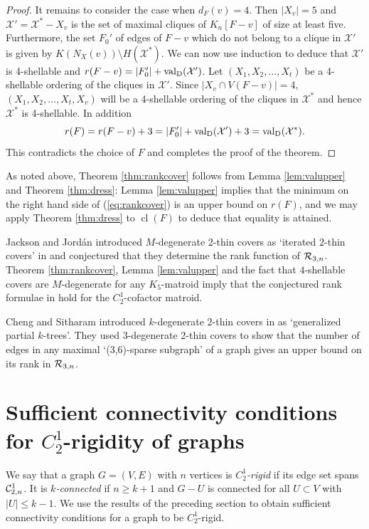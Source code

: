 \documentclass{daj}
\DeclareMathOperator{\cl}{cl}
\newcommand{\MX}{{\mathcal X}}
\newcommand{\valD}{{\rm val}_{\rm D}}
\begin{document}
\begin{proof}
It remains to consider the case when $d_F(v)= 4$. Then  $|X_v|=5$ and
$\MX'=\MX^*-X_v$ is the set of maximal cliques of $K_n[F-v]$ of size at least five. Furthermore, the set $F_0'$ of edges of $F-v$ which do not belong to a clique in $\MX'$ is given by $K(N_X(v))\setminus H(\MX^*)$.  We can now use induction to deduce that $\MX'$ is 4-shellable and $r(F-v)=|F_0'|+\valD(\MX')$. Let $(X_1,X_2,\ldots,X_t)$ be a 4-shellable ordering of the cliques in $\MX'$. Since $|X_v\cap V(F-v)|=4$, $(X_1,X_2,\ldots,X_t,X_v)$ will be a 4-shellable ordering of the cliques in $\MX^*$ and hence $\MX^*$ is 4-shellable. In addition
$$r(F)=r(F-v)+3=|F_0'|+\valD(\MX')+3=\valD(\MX^*).$$
This contradicts the choice of $F$ and completes the proof of the theorem.
\end{proof}

As noted above, Theorem \ref{thm:rankcover} follows from Lemma \ref{lem:valupper} and Theorem \ref{thm:dress}: Lemma \ref{lem:valupper} implies that the minimum on the right hand side of (\ref{eq:rankcover}) is an upper bound on $r(F)$, and we may apply 
Theorem \ref{thm:dress} to $\cl(F)$ to deduce that equality is attained.

\medskip
Jackson and Jord\'an introduced $M$-degenerate 2-thin covers as `{iterated $2$-thin covers}' in \cite{JJ06} and conjectured   that they determine the rank function of 
 ${\cal R}_{3,n}$. Theorem \ref{thm:rankcover}, Lemma \ref{lem:valupper} and the fact that $4$-shellable covers are $M$-degenerate  for any 
 $K_5$-matroid imply that the conjectured rank formulae  in \cite[Conjectures 3.2, 3.3]{JJ06} hold for the $C_2^1$-cofactor matroid. 
 
Cheng and Sitharam introduced  $k$-degenerate 2-thin covers in \cite{CS14} as `generalized partial $k$-trees'. They used 3-degenerate 2-thin covers to show that the number of edges in any maximal `(3,6)-sparse subgraph' of a graph gives an upper bound on its rank in 
${\cal R}_{3,n}$.



\section{\boldmath Sufficient connectivity conditions for $C_2^1$-rigidity of graphs}\label{sec:con}
We say that a graph $G=(V,E)$ with $n$ vertices is {\em $C_2^1$-rigid} if its edge set spans ${\cal C}_{2,n}^1$. It is {\em $k$-connected} if $n\geq k+1$ and $G-U$ is connected for all $U\subset V$ with $|U|\leq k-1$. 
We use the results of the preceding section to obtain sufficient connectivity conditions for a graph to be $C_2^1$-rigid. 
\end{document}
